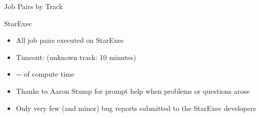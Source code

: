 \documentclass{beamer}
\begin{document}
\begin{frame}{Job Pairs by Track}
\def\angle{0}
\def\radius{3}
\def\cyclelist{{"blue","green","red","yellow"}}
\newcount\cyclecount {}
\newcount\ind {}
\begin{center}
\end{center}
\end{frame}


\begin{frame}{StarExec}
  \begin{itemize}
  \item All job pairs executed on StarExec
  \item Timeout:  (unknown track: 10 minutes)
  \item $\sim$  of compute time
  \end{itemize}

  \medskip

  \begin{center}
    {\Large{}}
  \end{center}

  \medskip

  \begin{itemize}
  \item Thanks to Aaron Stump for prompt help when problems or
    questions arose
  \item Only very few (and minor) bug reports submitted to the
    StarExec developers
  \end{itemize}
\end{frame}
\end{document}
